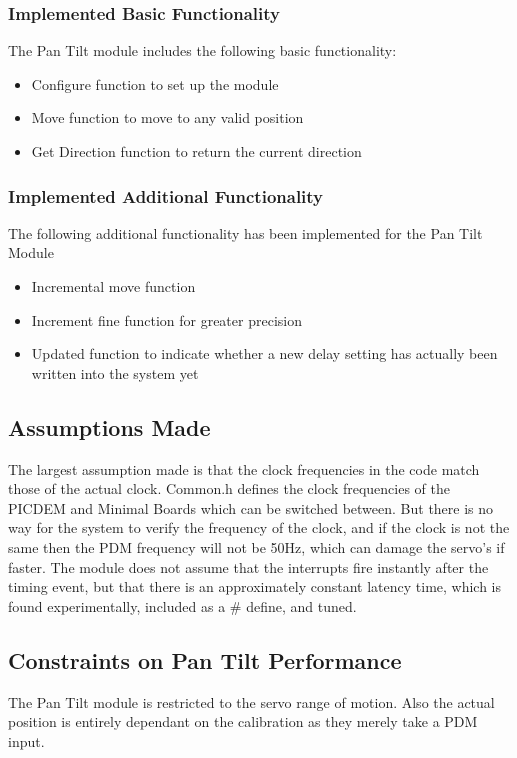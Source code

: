 \documentclass[]{report}
\begin{document}
\subsubsection{Implemented Basic Functionality}
The Pan Tilt module includes the following basic functionality:
\begin{itemize}
	\item Configure function to set up the module
	\item Move function to move to any valid position
	\item Get Direction function to return the current direction
\end{itemize}

\subsubsection{Implemented Additional Functionality}
The following additional functionality has been implemented for the Pan Tilt Module
\begin{itemize}
	\item Incremental move function
	\item Increment fine function for greater precision
	\item Updated function to indicate whether a new delay setting has actually been written into the system yet
\end{itemize}

\subsection{Assumptions Made}
The largest assumption made is that the clock frequencies in the code match those of the actual clock. Common.h defines the clock frequencies of the PICDEM and Minimal Boards which can be switched between. But there is no way for the system to verify the frequency of the clock, and if the clock is not the same then the PDM frequency will not be 50Hz, which can damage the servo's if faster. \newline
The module does not assume that the interrupts fire instantly after the timing event, but that there is an approximately constant latency time, which is found experimentally, included as a \# define, and tuned.

\subsection{Constraints on Pan Tilt Performance}
The Pan Tilt module is restricted to the servo range of motion. Also the actual position is entirely dependant on the calibration as they merely take a PDM input.
\end{document}

